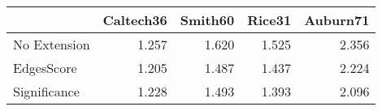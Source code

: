 \begin{tabular}{lrrrr}
\toprule
{} & Caltech36 & Smith60 & Rice31 & Auburn71 \\
\midrule
No Extension &     1.257 &   1.620 &  1.525 &    2.356 \\
EdgesScore   &     1.205 &   1.487 &  1.437 &    2.224 \\
Significance &     1.228 &   1.493 &  1.393 &    2.096 \\
\bottomrule
\end{tabular}
